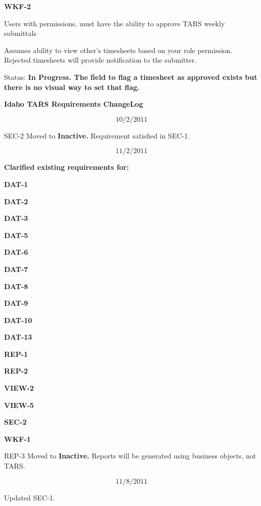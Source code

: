 \documentclass{article}
\begin{document}
\noindent \textit{}


\noindent \textbf{WKF-2}

\noindent Users with permissions, must have the ability to approve TARS weekly submittals

\noindent Assumes ability to view other's timesheets based on your role permission. Rejected timesheets will provide notification to the submitter.

\noindent Status: \textbf{In Progress.  The field to flag a timesheet as approved exists but there is no visual way to set that flag.}

\noindent \textit{}
\noindent \textit{}
\noindent \textit{}


\noindent \textbf{Idaho TARS Requirements ChangeLog}

\noindent 
\[10/2/2011\] 

 SEC-2 Moved to \textbf{Inactive. }Requirement satisfied in SEC-1.

\noindent 
\[11/2/2011\] 

 \textbf{Clarified existing requirements for:}

\textbf{  DAT-1}

\textbf{  DAT-2}

\textbf{  DAT-3}

\noindent \textbf{DAT-5}

\noindent \textbf{DAT-6}

\noindent \textbf{DAT-7}

\noindent \textbf{DAT-8}

\noindent \textbf{DAT-9}

\noindent \textbf{DAT-10}

\noindent \textbf{DAT-13}

\noindent \textbf{REP-1}

\noindent \textbf{REP-2}

\noindent \textbf{VIEW-2}

\noindent \textbf{VIEW-5}

\noindent \textbf{SEC-2}

\noindent \textbf{WKF-1}

  

 REP-3 Moved to \textbf{Inactive. }Reports will be generated using business objects, not TARS.

\noindent 
\[11/8/2011\] 

 Updated SEC-1. 

\textbf{ }
\end{document}
